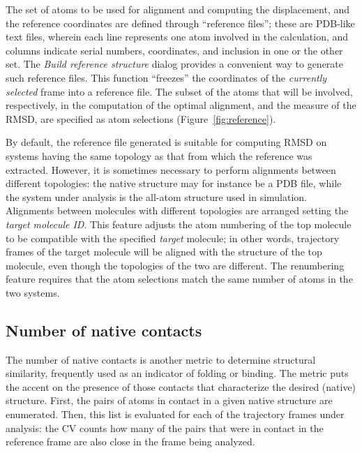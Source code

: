 \documentclass[preprint,review,11pt]{elsarticle}
\begin{document}
The set of atoms to be used for alignment and computing the
displacement, and the reference coordinates are defined through
``reference files''; these are PDB-like text files, wherein each line
represents one atom involved in the calculation, and columns indicate
serial numbers, coordinates, and inclusion in one or the other set.
The \emph{Build reference structure} dialog
 provides a convenient way to generate
such reference files.  This function ``freezes'' the coordinates of the
\emph{currently selected} frame into a reference file. The subset of
the atoms that will be involved, respectively, in the computation of
the optimal alignment, and the measure of the RMSD, are specified as
atom selections (Figure~\ref{fig:reference}).


By default, the reference file generated is suitable for computing
RMSD on systems having the same topology as that from which the
reference was extracted.  However, it is sometimes necessary to
perform alignments between different topologies: the native structure
may for instance be a PDB file, while the system under analysis is the
all-atom structure used in simulation. Alignments between molecules
with different topologies are arranged setting the \emph{target
  molecule ID}. This feature adjusts the atom numbering of the top
molecule to be compatible with the specified \emph{target} molecule;
in other words, trajectory frames of the target molecule will be
aligned with the structure of the top molecule, even though the
topologies of the two are different. The renumbering feature requires
that the atom selections match the same number of atoms in the two
systems.





\subsection{Number of native contacts}

The number of native contacts is another metric  to
determine structural similarity, frequently used as an indicator of folding
or binding.  The metric puts the accent on the presence of those
contacts that characterize the desired (native) structure. First, the
pairs of atoms in contact in a given native structure are
enumerated. Then, this list is evaluated
for each of the trajectory frames under analysis: the 
CV counts how many of the pairs that were in contact in the
reference frame are also close in the frame being analyzed.  
\end{document}
